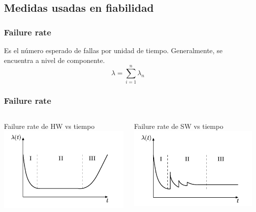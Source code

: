 \subsection{Medidas usadas en fiabilidad}
\begin{frame}
	\frametitle{Failure rate}
	Es el número esperado de fallas por unidad de tiempo. Generalmente, se encuentra a nivel de componente.
	\LARGE
	$$
	\lambda =  \sum_{i=1}^{n} \lambda_n
	$$	
\end{frame}

\begin{frame}
	\frametitle{Failure rate}
	\begin{columns}[T]
		\begin{column}{.5\textwidth}
			\centering
			Failure rate de HW vs tiempo
			\includegraphics[scale=0.4]{images/bathtub_curve.png}
		\end{column}
		\begin{column}{.5\textwidth}
			\centering
			Failure rate de SW vs tiempo
			\includegraphics[scale=0.4]{images/Failure_rate_software.png}
		\end{column}
	\end{columns}
\end{frame}

